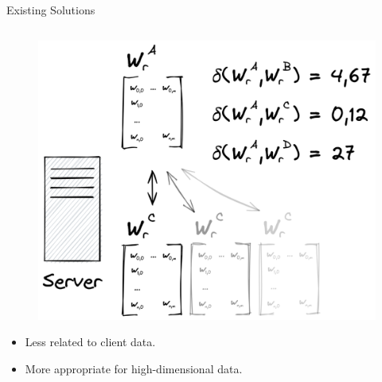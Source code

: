\documentclass[aspectratio=169,10pt]{imta}
\begin{document}
\begin{frame}{Existing Solutions}
\begin{columns}[T]
{\begin{column}{.33\textwidth}
        \begin{figure}
          \centering
          \includegraphics[height=.36\textheight]{figures/radar/server-side-comp}
        \end{figure}

        \begin{itemize}\smaller
          \item Less related to client data.
          \item More appropriate for high-dimensional data.
        \end{itemize}
      \end{column}%
    }

\end{columns}
\end{frame}
\end{document}

